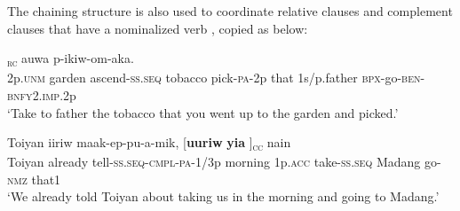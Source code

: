 The chaining structure is also used to coordinate relative clauses  and complement clauses that have a nominalized verb , copied as  below: 

\ea%
\label{ex:8:x1463}
\textsubscript{\textsc{rc}}  auwa  p-ikiw-om-aka.\\
2p.\textsc{unm} garden ascend-\textsc{ss}.\textsc{seq} tobacco  pick-\textsc{pa}-2p that 1s/p.father \textsc{\textsc{bp}x}-go-\textsc{ben}-\textsc{bnfy}2.\textsc{imp}.2p\\
\glt`Take to father the tobacco that you went up to the garden and picked.'
\z


\ea%
\label{ex:8:x1848}
\gll Toiyan  iiriw  maak-ep-pu-a-mik, [\textbf{uuriw} \textbf{yia}    ]\textsubscript{\textsc{cc}} nain\\
Toiyan  already  tell-\textsc{ss}.\textsc{seq}-\textsc{cmpl}-\textsc{pa}-1/3p morning 1p.\textsc{acc} take-\textsc{ss}.\textsc{seq} Madang go-\textsc{nmz} that1\\
\glt`We already told Toiyan about taking us in the morning and going to Madang.' 
\z